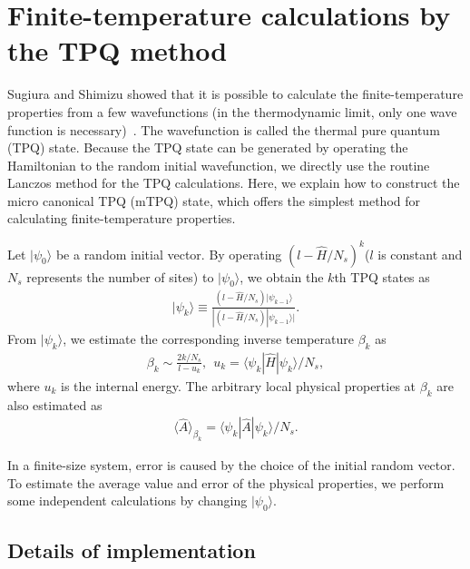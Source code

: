 \section{Finite-temperature calculations by the TPQ method}
\label{Ch:TPQ}
Sugiura and Shimizu showed that
it is possible to calculate the finite-temperature properties
from a few wavefunctions (in the thermodynamic limit, only one wave function is necessary)~\cite{Sugiura2012}.
The wavefunction is called the thermal pure quantum (TPQ) state.
Because the TPQ state can be generated by operating the Hamiltonian 
to the random initial wavefunction,
we directly use the routine Lanczos method for the TPQ calculations.
Here, we explain how to construct the micro canonical TPQ (mTPQ) state,
which offers the simplest method for calculating finite-temperature properties.

Let $|\psi_{0}\rangle$ be a random initial vector.
By operating $(l-\hat{H}/N_{s})^{k}$($l$ is constant and $N_{s}$ represents the number of sites) 
to $|\psi_{0}\rangle$,
we obtain the $k$th TPQ states as
\begin{align}
|\psi_{k}\rangle \equiv \frac{(l-\hat{H}/N_{s})|\psi_{k-1}\rangle}{|(l-\hat{H}/N_{s})|\psi_{k-1}\rangle|}.
\end{align}
From  $|\psi_{k}\rangle$, we estimate the corresponding inverse temperature $\beta_{k}$ as
\begin{align}
\beta_{k}\sim \frac{2k/N_{s}}{l-u_{k}},~~
u_{k} = \langle \psi_{k}|\hat{H}|\psi_{k}\rangle/N_{s},
\end{align}
where $u_{k}$ is the internal energy.
The arbitrary local physical properties at $\beta_{k}$ are also estimated as
\begin{align}
\langle \hat{A}\rangle_{\beta_{k}} =  \langle \psi_{k}|\hat{A}|\psi_{k}\rangle/N_{s}.
\end{align}

In a finite-size system,
error is caused by the choice of the initial random vector.
To estimate the average value and error of the physical properties,
we perform some independent calculations by changing $|\psi_{0}\rangle$.

\subsection{Details of implementation}
